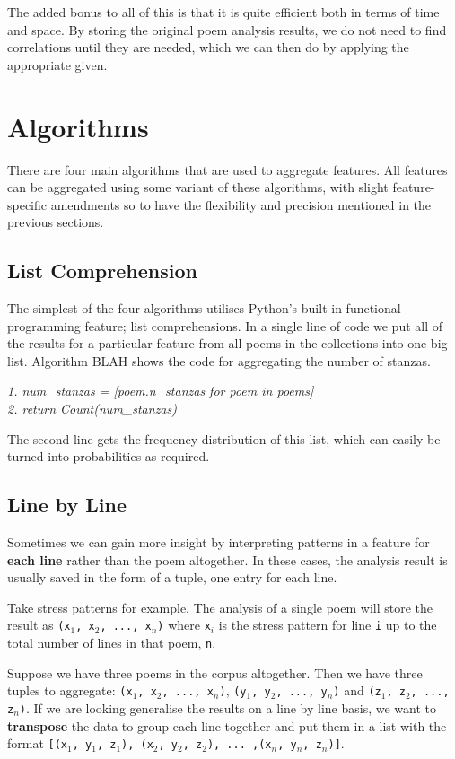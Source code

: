The added bonus to all of this is that it is quite efficient both in terms of time and space. By storing the original poem analysis results, we do not need to find correlations until they are needed, which we can then do by applying the appropriate given.


\section{Algorithms}

There are four main algorithms that are used to aggregate features. All features can be aggregated using some variant of these algorithms, with slight feature-specific amendments so to have the flexibility and precision mentioned in the previous sections.

\subsection{List Comprehension}
\label{sec:listcomp}

The simplest of the four algorithms utilises Python's built in functional programming feature; list comprehensions. In a single line of code we put all of the results for a particular feature from all poems in the collections into one big list. Algorithm BLAH shows the code for aggregating the number of stanzas.

\textit{
1. num\_stanzas = [poem.n\_stanzas for poem in poems]\\
2. return Count(num\_stanzas)
}

The second line gets the frequency distribution of this list, which can easily be turned into probabilities as required.


\subsection{Line by Line}

Sometimes we can gain more insight by interpreting patterns in a feature for \textbf{each line} rather than the poem altogether. In these cases, the analysis result is usually saved in the form of a tuple, one entry for each line.

Take stress patterns for example. The analysis of a single poem will store the result as \texttt{(x$_1$, x$_2$, ..., x$_n$)} where \texttt{x$_i$} is the stress pattern for line \texttt{i} up to the total number of lines in that poem, \texttt{n}.

Suppose we have three poems in the corpus altogether. Then we have three tuples to aggregate: \texttt{(x$_1$, x$_2$, ..., x$_n$)}, \texttt{(y$_1$, y$_2$, ..., y$_n$)} and \texttt{(z$_1$, z$_2$, ..., z$_n$)}. If we are looking generalise the results on a line by line basis, we want to \textbf{transpose} the data to group each line together and put them in a list with the format \texttt{[(x$_1$, y$_1$, z$_1$), (x$_2$, y$_2$, z$_2$), ... ,(x$_n$, y$_n$, z$_n$)]}.


